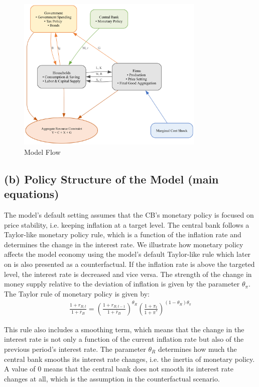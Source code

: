 \documentclass[12pt]{article}
\begin{document}
\begin{figure}[!h]
    \caption{Model Flow}\label{fig:model_flow}
    \centering
    \includegraphics[width=0.8\textwidth]{../../model_graph.png}
\end{figure}

\subsection*{(b) Policy Structure of the Model (main equations)}
The model's default setting assumes that the CB's monetary policy is focused on price stability, i.e. keeping inflation at a target level. The central bank
follows a Taylor-like monetary policy rule, which is a function of the inflation rate and determines the change in the interest rate. We illustrate how monetary policy affects the model economy using the model's default Taylor-like rule which later on is also presented as a counterfactual. If the inflation rate is above the targeted level, the interest rate is decreased and vice versa. The strength of the change in money supply relative to the deviation of inflation is given by the parameter $\theta_{\pi}$. 
The Taylor rule of monetary policy is given by:
\begin{align}
    \frac{1 + r_{B,t}}{1 + \bar{r}_B} = \left( \frac{1 + r_{B,t-1}}{1 + \bar{r}_B} \right)^{\theta_R} \left( \frac{1 + \pi_t}{1 + \pi^*} \right)^{(1 - \theta_R)\theta_{\pi}}
\end{align}

This rule also includes a smoothing term, which means that the change in the interest rate is not only a function of the current inflation rate but also of the previous period's interest rate. The parameter $\theta_R$ determines how much the central bank smooths its interest rate changes, i.e. the inertia of monetary policy. A value of 0 means that the central bank does not smooth its interest rate changes at all, which is the assumption in the counterfactual scenario. 
\end{document}
